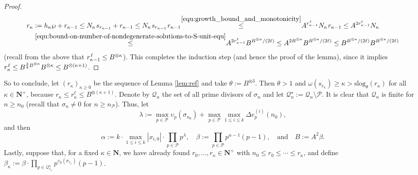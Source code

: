 \documentclass[reqno]{amsart}
\theoremstyle{remark}
\providecommand{\NNb}{\mathbf{N}}
\providecommand{\PPc}{\mathcal{P}}
\newcommand{\fixed}[2][1]{%
  \begingroup
  \spaceskip=#1\fontdimen2\font minus \fontdimen4\font
  \xspaceskip=0pt\relax
  #2%
  \endgroup
}
\begin{document}
\begin{proof}
\begin{equation*}
\begin{split}
r_\kappa
    &
    := h_\kappa \wp + r_{\kappa-1} \le N_\kappa \fixed[0.25]{\text{ }} s_{r_{\kappa-1}} +r_{\kappa-1}
    \le N_\kappa \fixed[0.25]{\text{ }} s_{r_{\kappa-1}} \fixed[0.25]{\text{ }} r_{\kappa-1}
    \fixed[-0.75]{\text{ }}\stackrel{\eqref{equ:growth_bound_and_monotonicity}}{\le}\fixed[-0.75]{\text{ }}
    A^{r_{\kappa-1}^{\fixed[0.15]{\text{ }}\ell}} N_\kappa \fixed[0.25]{\text{ }} r_{\kappa-1} \le A^{2r_{\kappa -1}^{\ell }}
N_{\kappa } \\
    &
    \stackrel{\eqref{equ:bound-on-number-of-nondegenerate-solutions-to-S-unit-equ}}{\le}\fixed[-0.75]{\text{ }}
    A^{2r_{\kappa -1}^{\ell }} B^{B^{\otimes \kappa }/(2\ell )}
\le A^{2B^{
\otimes \kappa }}B^{B^{\otimes \kappa }/(2\ell )}  \le B^{B^{\otimes \kappa }/(2\ell )} B^{B^{\otimes
\kappa }/(2\ell )}
\end{split}
\end{equation*}
(recall from the above that $r_{\kappa-1}^{\fixed[0.25]{\text{ }}\ell} \le B^{\otimes \kappa}$). This completes the induction step (and hence the proof of the lemma), since it implies
$r_\kappa^{\fixed[0.25]{\text{ }}\ell} \le B^{\frac{3}{4} B^{\otimes \kappa}} B^{\otimes \kappa} \le B^{\otimes (\kappa+1)}$.
%
\end{proof}
%
So to conclude, let $(r_\kappa)_{\kappa \ge 0}$ be the sequence of Lemma \ref{lem:ref} and take $\theta :=B^{\otimes 3}$. Then $\theta > 1$ and
$\omega (s_{r_{\kappa }}) \ge \kappa > \mathrm{slog}_{\theta }(r_{
\kappa })$ for all $\kappa \in \mathbf{N}^{+}$, because $r_{\kappa }
\le r_{\kappa }^{\ell } \le B^{\otimes (\kappa
+1)}$.
%
\vskip 0.3cm
\noindent{} Denote by $\mathcal Q_n$ the set of all prime divisors of $\sigma_n$ and let $\mathcal Q_n^\star := \mathcal Q_n \setminus \mathcal P$. It is clear that $\mathcal Q_n$ is finite for $n \ge n_0$ (recall that $\sigma_n \ne 0$ for $n \ge n_\PPc$). Thus, let
$$
\lambda := \max_{p \in \mathcal P} \upsilon_p(\sigma_{n_0}) + \max_{p \in \mathcal P} \max_{1 \le i \le k} \Delta e_p^{(i)}(n_0),
$$
and then
$$
\alpha := k \cdot \max_{1 \le i \le k} |x_{i,0}| \cdot \prod_{p \in \mathcal{P}} p^\lambda,
\quad
\beta := \prod_{p \in \mathcal{P}} p^{\alpha-1}(p-1),
\quad\text{and}\quad
B := A^2 \beta.
$$
Lastly, suppose that, for a fixed $\kappa \in \NNb$, we have already found $r_0, \ldots, r_\kappa \in \mathbf N^+$ with $n_0 \le r_0 \le \cdots \le r_\kappa$, and define
$\beta_\kappa := \beta \cdot \prod_{p \in \mathcal{Q}_{r_\kappa}^\star} p^{\upsilon_p(\sigma_{r_\kappa})}(p-1)$.
\end{document}
